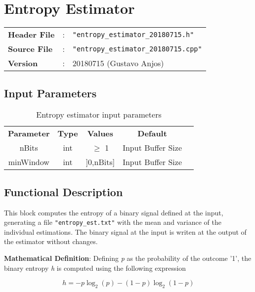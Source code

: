 \clearpage

\section{Entropy Estimator}

\begin{tcolorbox}	
	\begin{tabular}{p{2.75cm} p{0.2cm} p{10.5cm}} 	
		\textbf{Header File}   &:& \texttt{"entropy\_estimator\_20180715.h"} \\
		\textbf{Source File}   &:& \texttt{"entropy\_estimator\_20180715.cpp"} \\
		\textbf{Version}       &:& 20180715 (Gustavo Anjos) \\
	\end{tabular}
\end{tcolorbox}


\subsection*{Input Parameters}

\begin{table}[h]
	\centering
	\begin{tabular}{|c|c|c|c|c|}
		\cline{1-4}
		\textbf{Parameter} & \textbf{Type} &\textbf{Values} &   \textbf{Default}& \\ \cline{1-4}
		nBits 	& int 	& $\geq$ 1 & Input Buffer Size \\ \cline{1-4}
		minWindow	 & int 	& ]0,nBits]  & Input Buffer Size \\ \cline{1-4} \cline{1-4}
	\end{tabular}
	\caption{Entropy estimator input parameters}
	\label{table:estimator_in_par}
\end{table}

\subsection*{Functional Description}
This block computes the entropy of a binary signal defined at the input, generating 
a file \texttt{"entropy\_est.txt"} with the mean and variance of the individual estimations.
The binary signal at the input is writen at the output of the estimator without changes.

\textbf{Mathematical Definition}: Defining \textit{p} as the probability of the 
outcome '1', the binary entropy \textit{h} is computed using the following expression

\begin{equation}
h = -p\log_2(p) - (1-p)\log_2(1-p)
\end{equation}  
   
